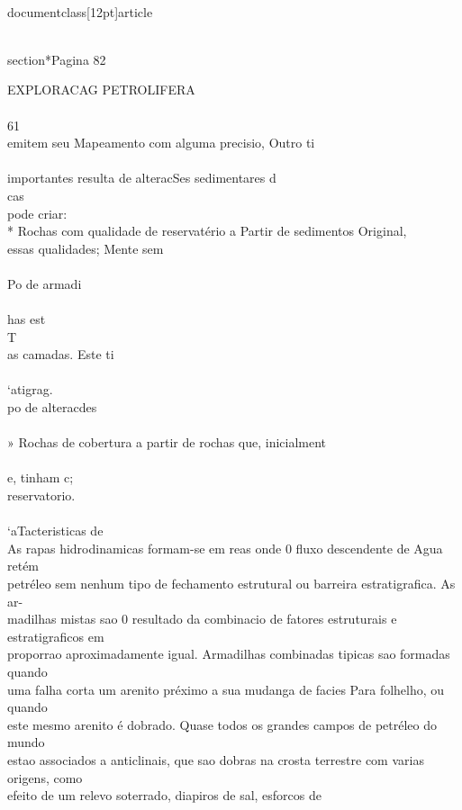\\documentclass[12pt]{article}
\begin{document}
{\\section*{Pagina 82}

EXPLORACAG PETROLIFERA\\
\\
61\\
emitem seu Mapeamento com alguma precisio, Outro ti\\
\\
importantes resulta de alteracSes sedimentares d\\
cas\\
pode criar:\\
* Rochas com qualidade de reservatério a Partir de sedimentos Original,\\
essas qualidades; Mente sem\\
\\
Po de armadi\\
\\
has est\\
T\\
as camadas. Este ti\\
\\
‘atigrag.\\
po de alteracdes\\
\\
» Rochas de cobertura a partir de rochas que, inicialment\\
\\
e, tinham c;\\
reservatorio.\\
\\
‘aTacteristicas de\\
As rapas hidrodinamicas formam-se em reas onde 0 fluxo descendente de Agua retém\\
petréleo sem nenhum tipo de fechamento estrutural ou barreira estratigrafica. As ar-\\
madilhas mistas sao 0 resultado da combinacio de fatores estruturais e estratigraficos em\\
proporrao aproximadamente igual. Armadilhas combinadas tipicas sao formadas quando\\
uma falha corta um arenito préximo a sua mudanga de facies Para folhelho, ou quando\\
este mesmo arenito é dobrado. Quase todos os grandes campos de petréleo do mundo\\
estao associados a anticlinais, que sao dobras na crosta terrestre com varias origens, como\\
efeito de um relevo soterrado, diapiros de sal, esforcos de\\
}
\end{document}

